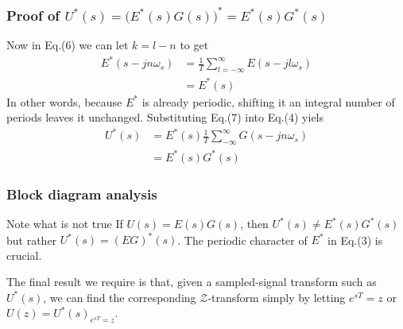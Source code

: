 \begin{frame}
	\frametitle{Proof of $U^{*}(s) = \big(E^{*}(s)G(s)\big)^{*} = E^{*}(s)G^{*}(s)$}
	Now in Eq.(6) we can let $k = l - n$ to get
	\begin{equation}
	\begin{split}
	E^{*}(s-jn\omega_s) &= \frac{1}{T} \sum_{l=-\infty}^{\infty} E(s - jl\omega_s)\\
	&= E^{*}(s)
	\end{split}
	\end{equation}
	\justify
	In other words, because $E^{*}$ is already periodic, shifting it an integral number of periods leaves it unchanged. Substituting Eq.(7) into Eq.(4) yiels
	\begin{equation}
	\begin{split}
	U^{*}(s) &= E^{*}(s) \frac{1}{T} \sum_{-\infty}^{\infty} G(s - jn\omega_s)\\
	&= E^{*}(s)G^{*}(s)
	\end{split}
	\end{equation}
\end{frame}

\begin{frame}
	\frametitle{Block diagram analysis}
	\begin{alertblock}{Note what is not true}
		If $U(s) = E(s)G(s)$, then $U^{*}(s) \neq E^{*}(s) G^{*}(s)$ but rather $U^{*}(s) = (EG)^{*}(s)$. The periodic character of $E^{*}$ in Eq.(3) is crucial.
	\end{alertblock}
	\justify
	The final result we require is that, given a sampled-signal transform such as $U^{*}(s)$, we can find the corresponding $\mathcal{Z}$-transform simply by letting $e^{sT} = z$ or $U(z) = U^{*}(s)_{e^{sT} = z}$.
\end{frame}


